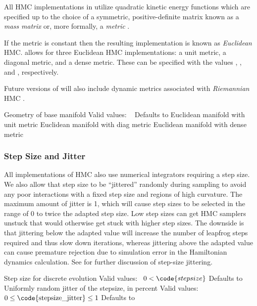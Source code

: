 All HMC implementations in \Stan utilize quadratic kinetic energy
functions which are specified up to the choice of a symmetric,
positive-definite matrix known as a \textit{mass matrix} or, more
formally, a \textit{metric} \citep{Betancourt-Stein:2011}.

If the metric is constant then the resulting implementation is known
as \textit{Euclidean} HMC.  \Stan allows for three Euclidean HMC
implementations: a unit metric, a diagonal metric, and a dense
metric.  These can be specified with the values ,
, and , respectively.

Future versions of \Stan will also include dynamic metrics associated
with \textit{Riemannian} HMC \citep{GirolamiCalderhead:2011, Betancourt:2012}.
%
\begin{description}
          {Geometry of base manifold}
          {Valid values: \  }
          {Defaults to }
%
            {Euclidean manifold with unit metric}
%
            {Euclidean manifold with diag metric}
%
            {Euclidean manifold with dense metric}
\end{description}
%

\subsubsection{Step Size and Jitter}

All implementations of HMC also use numerical integrators requiring a
step size.  We also allow that step size to be ``jittered'' randomly
during sampling to avoid any poor interactions with a fixed step size
and regions of high curvature.  The maximum amount of jitter is 1,
which will cause step sizes to be selected in the range of 0 to twice
the adapted step size.  Low step sizes can get HMC samplers unstuck
that would otherwise get stuck with higher step sizes.  The downside
is that jittering below the adapted value will increase the number of
leapfrog steps required and thus slow down iterations, whereas
jittering above the adapted value can cause premature rejection due to
simulation error in the Hamiltonian dynamics calculation.  See
\citep{Neal:2011} for further discussion of step-size jittering.
%
\begin{description}
%
          {Step size for discrete evolution}
          {Valid values: \  $0 < \code{stepsize}$}
          {Defaults to }
%
          {Uniformly random jitter of the stepsize, in percent}
          {Valid values: \  $0 \leq \mbox{\code{stepsize\_jitter}} \leq 1$}
          {Defaults to }
\end{description}

